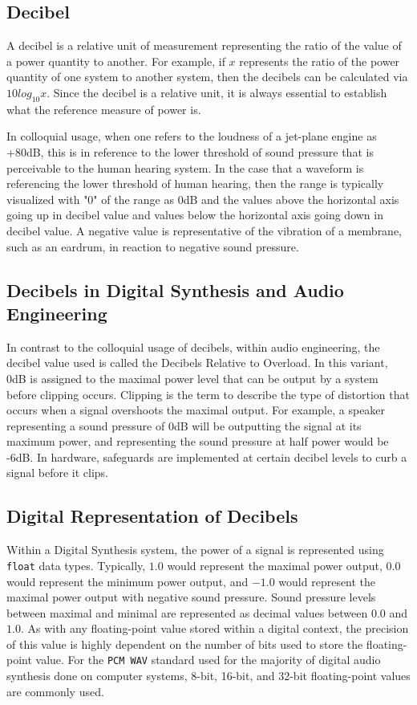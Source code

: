 \documentclass[a4paper,12pt]{report}
\begin{document}
\subsection{Decibel}
A decibel is a relative unit of measurement representing the ratio of the value of a power quantity to another. For example, if $x$ represents the ratio of the power quantity of one system to another system, then the decibels can be calculated via $10 log_10 x$. Since the decibel is a relative unit, it is always essential to establish what the reference measure of power is. 

In colloquial usage, when one refers to the loudness of a jet-plane engine as +80dB, this is in reference to the lower threshold of sound pressure that is perceivable to the human hearing system. In the case that a waveform is referencing the lower threshold of human hearing, then the range is typically visualized with "0" of the range as 0dB and the values above the horizontal axis going up in decibel value and values below the horizontal axis going down in decibel value. A negative value is representative of the vibration of a membrane, such as an eardrum, in reaction to negative sound pressure. 

\subsection{Decibels in Digital Synthesis and Audio Engineering}
In contrast to the colloquial usage of decibels, within audio engineering, the decibel value used is called the Decibels Relative to Overload.  In this variant, 0dB is assigned to the maximal power level that can be output by a system before clipping occurs. Clipping is the term to describe the type of distortion that occurs when a signal overshoots the maximal output. For example, a speaker representing a sound pressure of 0dB will be outputting the signal at its maximum power, and representing the sound pressure at half power would be -6dB. In hardware, safeguards are implemented at certain decibel levels to curb a signal before it clips.

\subsection{Digital Representation of Decibels}
Within a Digital Synthesis system, the power of a signal is represented using \texttt{float} data types. Typically, $1.0$ would represent the maximal power output, $0.0$ would represent the minimum power output, and $-1.0$ would represent the maximal power output with negative sound pressure. Sound pressure levels between maximal and minimal are represented as decimal values between $0.0$ and $1.0$. As with any floating-point value stored within a digital context, the precision of this value is highly dependent on the number of bits used to store the floating-point value. For the \texttt{PCM\ WAV} standard used for the majority of digital audio synthesis done on computer systems, 8-bit, 16-bit, and 32-bit floating-point values are commonly used.
\end{document}
